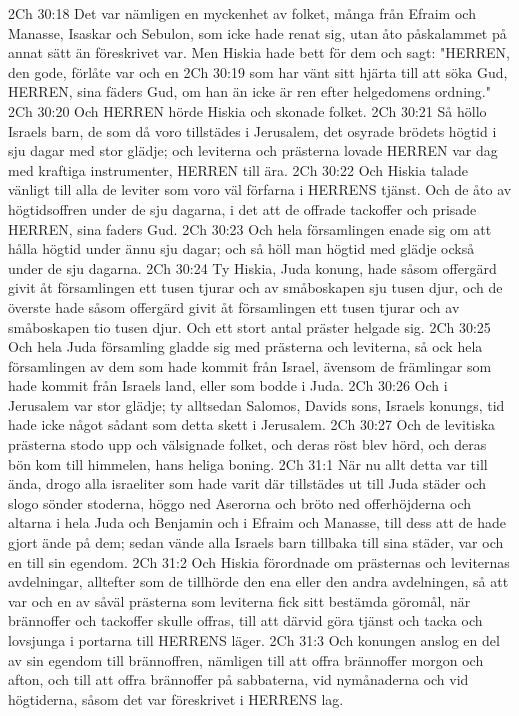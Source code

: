 2Ch 30:18  Det var nämligen en myckenhet av folket, många från Efraim och Manasse, Isaskar och Sebulon, som icke hade renat sig, utan åto påskalammet på annat sätt än föreskrivet var. Men Hiskia hade bett för dem och sagt: "HERREN, den gode, förlåte var och en
2Ch 30:19  som har vänt sitt hjärta till att söka Gud, HERREN, sina fäders Gud, om han än icke är ren efter helgedomens ordning."
2Ch 30:20  Och HERREN hörde Hiskia och skonade folket.
2Ch 30:21  Så höllo Israels barn, de som då voro tillstädes i Jerusalem, det osyrade brödets högtid i sju dagar med stor glädje; och leviterna och prästerna lovade HERREN var dag med kraftiga instrumenter, HERREN till ära.
2Ch 30:22  Och Hiskia talade vänligt till alla de leviter som voro väl förfarna i HERRENS tjänst. Och de åto av högtidsoffren under de sju dagarna, i det att de offrade tackoffer och prisade HERREN, sina faders Gud.
2Ch 30:23  Och hela församlingen enade sig om att hålla högtid under ännu sju dagar; och så höll man högtid med glädje också under de sju dagarna.
2Ch 30:24  Ty Hiskia, Juda konung, hade såsom offergärd givit åt församlingen ett tusen tjurar och av småboskapen sju tusen djur, och de överste hade såsom offergärd givit åt församlingen ett tusen tjurar och av småboskapen tio tusen djur. Och ett stort antal präster helgade sig.
2Ch 30:25  Och hela Juda församling gladde sig med prästerna och leviterna, så ock hela församlingen av dem som hade kommit från Israel, ävensom de främlingar som hade kommit från Israels land, eller som bodde i Juda.
2Ch 30:26  Och i Jerusalem var stor glädje; ty alltsedan Salomos, Davids sons, Israels konungs, tid hade icke något sådant som detta skett i Jerusalem.
2Ch 30:27  Och de levitiska prästerna stodo upp och välsignade folket, och deras röst blev hörd, och deras bön kom till himmelen, hans heliga boning.
2Ch 31:1  När nu allt detta var till ända, drogo alla israeliter som hade varit där tillstädes ut till Juda städer och slogo sönder stoderna, höggo ned Aserorna och bröto ned offerhöjderna och altarna i hela Juda och Benjamin och i Efraim och Manasse, till dess att de hade gjort ände på dem; sedan vände alla Israels barn tillbaka till sina städer, var och en till sin egendom.
2Ch 31:2  Och Hiskia förordnade om prästernas och leviternas avdelningar, alltefter som de tillhörde den ena eller den andra avdelningen, så att var och en av såväl prästerna som leviterna fick sitt bestämda göromål, när brännoffer och tackoffer skulle offras, till att därvid göra tjänst och tacka och lovsjunga i portarna till HERRENS läger.
2Ch 31:3  Och konungen anslog en del av sin egendom till brännoffren, nämligen till att offra brännoffer morgon och afton, och till att offra brännoffer på sabbaterna, vid nymånaderna och vid högtiderna, såsom det var föreskrivet i HERRENS lag.
